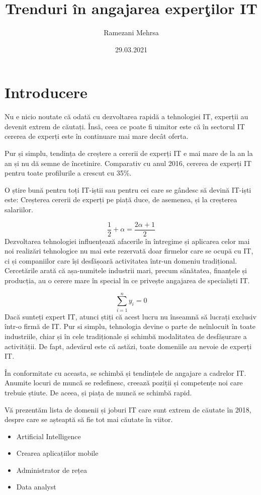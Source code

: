 \documentclass{article}
\title{Trenduri în angajarea experţilor IT}
\author{Ramezani Mehrsa}
\date{29.03.2021}
\begin{document}
\maketitle
\tableofcontents
\newpage 
\section{Introducere}
\hspace{0.5 cm}Nu e nicio noutate că odată cu dezvoltarea rapidă a tehnologiei IT, experții au devenit extrem de căutați. Însă, ceea ce poate fi uimitor este că în sectorul IT cererea de experți este în continuare mai mare decât oferta. \par
Pur și simplu, tendința de creștere a cererii de experți IT e mai mare de la an la an și nu dă semne de încetinire. Comparativ cu anul 2016, cererea de experți IT pentru toate profilurile a crescut cu 35\%. \par
O știre bună pentru toți IT-iștii sau pentru cei care se gândesc să devină IT-iști este: Creșterea cererii de experți pe piață duce, de asemenea, și la creșterea salariilor.\par $$\frac12+\alpha=\frac{2\alpha+1}2$$ 
Dezvoltarea tehnologiei influențează afacerile în întregime și aplicarea celor mai noi realizări tehnologice nu mai este rezervată doar firmelor care se ocupă cu IT, ci și companiilor care își desfășoară activitatea într-un domeniu tradițional. Cercetările arată că așa-numitele industrii mari, precum sănătatea, finanțele și producția, au o cerere mare în special în ce privește angajarea de specialiști IT.\par $$\sum_{i=1}^ny_i=0$$
Dacă sunteți expert IT, atunci știți că acest lucru nu înseamnă să lucrați exclusiv într-o firmă de IT. Pur si simplu, tehnologia devine o parte de neînlocuit în toate industriile, chiar și în cele tradiționale și schimbă modalitatea de desfășurare a activității. De fapt, adevărul este că astăzi, toate domeniile au nevoie de experți IT.\par
În conformitate cu aceasta, se schimbă și tendințele de angajare a cadrelor IT. Anumite locuri de muncă se redefinesc, creează poziții și competențe noi care trebuie știute. \cite {site} De aceea, și piața de muncă se schimbă rapid.\par
Vă prezentăm lista de domenii și joburi IT care sunt extrem de căutate în 2018, despre care se așteaptă să fie tot mai căutate în viitor.
\begin{itemize}
\item Artificial Intelligence
\item Crearea aplicațiilor mobile
\item Administrator de rețea
\item Data analyst
\end{itemize} 
\end{document}
